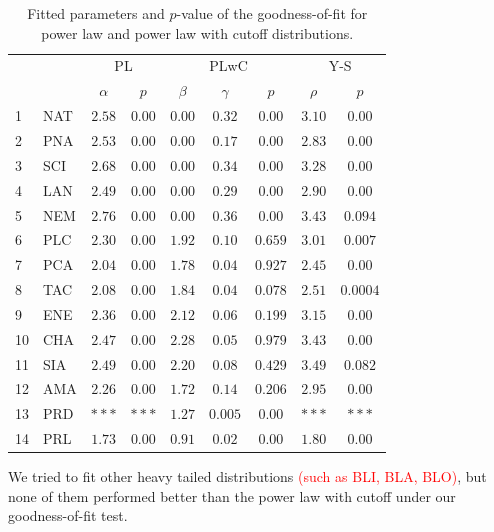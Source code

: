 \documentclass[aps,prl,floatfix,twocolumn]{revtex4-1}
\begin{document}
\begin{table}
 \begin{tabular}{l|l||c|c||c|c|c||c|c}
  && \multicolumn{2}{c||}{PL} & \multicolumn{3}{c||}{PLwC} & \multicolumn{2}{c}{Y-S} \\
  && $\alpha$ & $p$ & $\beta$ & $\gamma$ & $p$ & $\rho$ & $p$ \\
  \hline
  \hline 1 & NAT & $2.58$ & $0.00$ & $0.00$ & $0.32$ & $0.00$ & $3.10$ & $0.00$  \\
  \hline 2 & PNA & $2.53$ & $0.00$ & $0.00$ & $0.17$ & $0.00$ & $2.83$ & $0.00$  \\
  \hline 3 & SCI & $2.68$ & $0.00$ & $0.00$ & $0.34$ & $0.00$ & $3.28$ & $0.00$  \\
  \hline 4 & LAN & $2.49$ & $0.00$ & $0.00$ & $0.29$ & $0.00$ & $2.90$ & $0.00$  \\
  \hline 5 & NEM & $2.76$ & $0.00$ & $0.00$ & $0.36$ & $0.00$ & $3.43$ & $0.094$ \\
  \hline 6 & PLC & $2.30$ & $0.00$ & $1.92$ & $0.10$ & $0.659$ & $3.01$ & $0.007$ \\
  \hline 7 & PCA & $2.04$ & $0.00$ & $1.78$ & $0.04$ & $0.927$ & $2.45$ & $0.00$  \\
  \hline 8 & TAC & $2.08$ & $0.00$ & $1.84$ & $0.04$ & $0.078$ & $2.51$ & $0.0004$ \\
  \hline 9 & ENE & $2.36$ & $0.00$ & $2.12$ & $0.06$ & $0.199$ & $3.15$ & $0.00$  \\
  \hline 10 & CHA & $2.47$ & $0.00$ & $2.28$ & $0.05$ & $0.979$ & $3.43$ & $0.00$  \\
  \hline 11 & SIA & $2.49$ & $0.00$ & $2.20$ & $0.08$ & $0.429$ & $3.49$ & $0.082$ \\
  \hline 12 & AMA & $2.26$ & $0.00$ & $1.72$ & $0.14$ & $0.206$ & $2.95$ & $0.00$  \\
  \hline 13 & PRD & $***$ & $***$ & $1.27$ & $0.005$ & $0.00$ & $***$ & $***$ \\
  \hline 14 & PRL & $1.73$ & $0.00$ & $0.91$ & $0.02$ & $0.00$ & $1.80$ & $0.00$  
 \end{tabular}
 \caption{Fitted parameters and $p$-value of the goodness-of-fit for power law and power law with cutoff distributions.}
 \label{tab:fit_gof}
\end{table}

We tried to fit other heavy tailed distributions \textcolor{red}{(such as BLI, BLA, BLO)}, but none of them performed better than the power law with cutoff under our goodness-of-fit test. 
\end{document}
